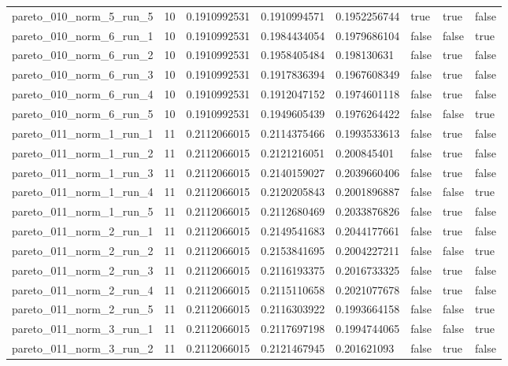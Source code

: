 \begin{tabular}{@{}llllllll@{}}
pareto\_010\_norm\_5\_run\_5 & 10 & 0.1910992531 & 0.1910994571 & 0.1952256744 & true & true & false \\
pareto\_010\_norm\_6\_run\_1 & 10 & 0.1910992531 & 0.1984434054 & 0.1979686104 & false & false & true \\
pareto\_010\_norm\_6\_run\_2 & 10 & 0.1910992531 & 0.1958405484 & 0.198130631 & false & true & false \\
pareto\_010\_norm\_6\_run\_3 & 10 & 0.1910992531 & 0.1917836394 & 0.1967608349 & false & true & false \\
pareto\_010\_norm\_6\_run\_4 & 10 & 0.1910992531 & 0.1912047152 & 0.1974601118 & false & true & false \\
pareto\_010\_norm\_6\_run\_5 & 10 & 0.1910992531 & 0.1949605439 & 0.1976264422 & false & false & true \\
pareto\_011\_norm\_1\_run\_1 & 11 & 0.2112066015 & 0.2114375466 & 0.1993533613 & false & true & false \\
pareto\_011\_norm\_1\_run\_2 & 11 & 0.2112066015 & 0.2121216051 & 0.200845401 & false & true & false \\
pareto\_011\_norm\_1\_run\_3 & 11 & 0.2112066015 & 0.2140159027 & 0.2039660406 & false & true & false \\
pareto\_011\_norm\_1\_run\_4 & 11 & 0.2112066015 & 0.2120205843 & 0.2001896887 & false & false & true \\
pareto\_011\_norm\_1\_run\_5 & 11 & 0.2112066015 & 0.2112680469 & 0.2033876826 & false & true & false \\
pareto\_011\_norm\_2\_run\_1 & 11 & 0.2112066015 & 0.2149541683 & 0.2044177661 & false & true & false \\
pareto\_011\_norm\_2\_run\_2 & 11 & 0.2112066015 & 0.2153841695 & 0.2004227211 & false & false & true \\
pareto\_011\_norm\_2\_run\_3 & 11 & 0.2112066015 & 0.2116193375 & 0.2016733325 & false & true & false \\
pareto\_011\_norm\_2\_run\_4 & 11 & 0.2112066015 & 0.2115110658 & 0.2021077678 & false & true & false \\
pareto\_011\_norm\_2\_run\_5 & 11 & 0.2112066015 & 0.2116303922 & 0.1993664158 & false & false & true \\
pareto\_011\_norm\_3\_run\_1 & 11 & 0.2112066015 & 0.2117697198 & 0.1994744065 & false & false & true \\
pareto\_011\_norm\_3\_run\_2 & 11 & 0.2112066015 & 0.2121467945 & 0.201621093 & false & true & false \\

\end{tabular}
